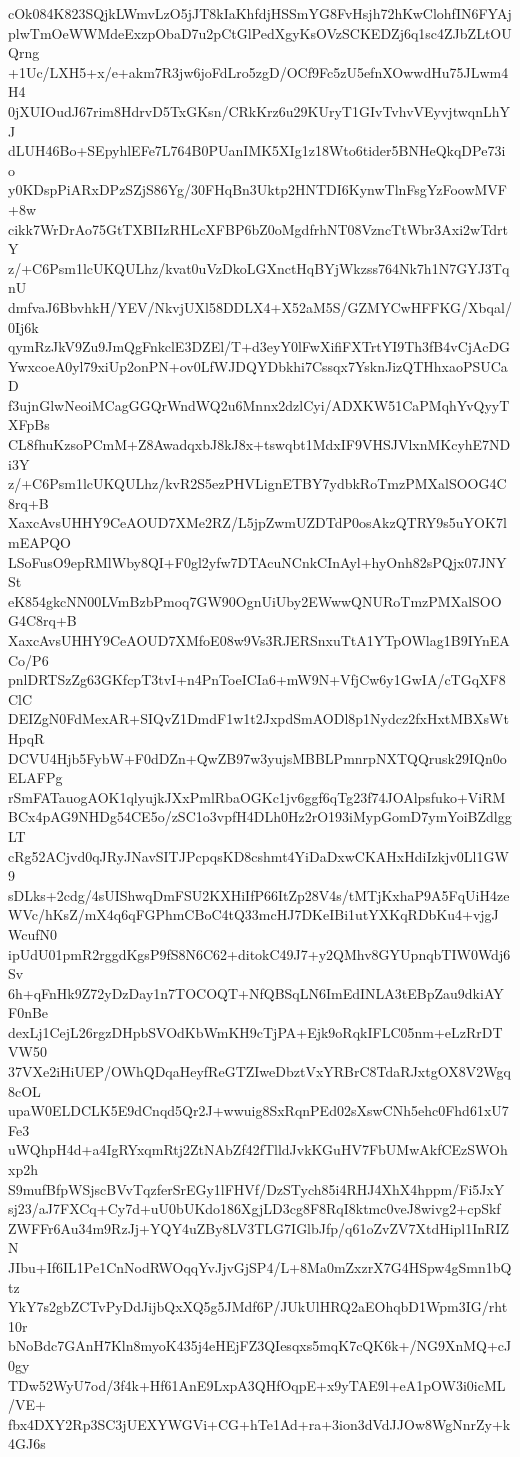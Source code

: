 cOk084K823SQjkLWmvLzO5jJT8kIaKhfdjHSSmYG8FvHsjh72hKwClohfIN6FYAj
plwTmOeWWMdeExzpObaD7u2pCtGlPedXgyKsOVzSCKEDZj6q1sc4ZJbZLtOUQrng
+1Uc/LXH5+x/e+akm7R3jw6joFdLro5zgD/OCf9Fc5zU5efnXOwwdHu75JLwm4H4
0jXUIOudJ67rim8HdrvD5TxGKsn/CRkKrz6u29KUryT1GIvTvhvVEyvjtwqnLhYJ
dLUH46Bo+SEpyhlEFe7L764B0PUanIMK5XIg1z18Wto6tider5BNHeQkqDPe73io
y0KDspPiARxDPzSZjS86Yg/30FHqBn3Uktp2HNTDI6KynwTlnFsgYzFoowMVF+8w
cikk7WrDrAo75GtTXBIIzRHLcXFBP6bZ0oMgdfrhNT08VzncTtWbr3Axi2wTdrtY
z/+C6Psm1lcUKQULhz/kvat0uVzDkoLGXnctHqBYjWkzss764Nk7h1N7GYJ3TqnU
dmfvaJ6BbvhkH/YEV/NkvjUXl58DDLX4+X52aM5S/GZMYCwHFFKG/Xbqal/0Ij6k
qymRzJkV9Zu9JmQgFnkclE3DZEl/T+d3eyY0lFwXifiFXTrtYI9Th3fB4vCjAcDG
YwxcoeA0yl79xiUp2onPN+ov0LfWJDQYDbkhi7Cssqx7YsknJizQTHhxaoPSUCaD
f3ujnGlwNeoiMCagGGQrWndWQ2u6Mnnx2dzlCyi/ADXKW51CaPMqhYvQyyTXFpBs
CL8fhuKzsoPCmM+Z8AwadqxbJ8kJ8x+tswqbt1MdxIF9VHSJVlxnMKcyhE7NDi3Y
z/+C6Psm1lcUKQULhz/kvR2S5ezPHVLignETBY7ydbkRoTmzPMXalSOOG4C8rq+B
XaxcAvsUHHY9CeAOUD7XMe2RZ/L5jpZwmUZDTdP0osAkzQTRY9s5uYOK7lmEAPQO
LSoFusO9epRMlWby8QI+F0gl2yfw7DTAcuNCnkCInAyl+hyOnh82sPQjx07JNYSt
eK854gkcNN00LVmBzbPmoq7GW90OgnUiUby2EWwwQNURoTmzPMXalSOOG4C8rq+B
XaxcAvsUHHY9CeAOUD7XMfoE08w9Vs3RJERSnxuTtA1YTpOWlag1B9IYnEACo/P6
pnlDRTSzZg63GKfcpT3tvI+n4PnToeICIa6+mW9N+VfjCw6y1GwIA/cTGqXF8ClC
DEIZgN0FdMexAR+SIQvZ1DmdF1w1t2JxpdSmAODl8p1Nydcz2fxHxtMBXsWtHpqR
DCVU4Hjb5FybW+F0dDZn+QwZB97w3yujsMBBLPmnrpNXTQQrusk29IQn0oELAFPg
rSmFATauogAOK1qlyujkJXxPmlRbaOGKc1jv6ggf6qTg23f74JOAlpsfuko+ViRM
BCx4pAG9NHDg54CE5o/zSC1o3vpfH4DLh0Hz2rO193iMypGomD7ymYoiBZdlggLT
cRg52ACjvd0qJRyJNavSITJPcpqsKD8cshmt4YiDaDxwCKAHxHdiIzkjv0Ll1GW9
sDLks+2cdg/4sUIShwqDmFSU2KXHiIfP66ItZp28V4s/tMTjKxhaP9A5FqUiH4ze
WVc/hKsZ/mX4q6qFGPhmCBoC4tQ33mcHJ7DKeIBi1utYXKqRDbKu4+vjgJWcufN0
ipUdU01pmR2rggdKgsP9fS8N6C62+ditokC49J7+y2QMhv8GYUpnqbTIW0Wdj6Sv
6h+qFnHk9Z72yDzDay1n7TOCOQT+NfQBSqLN6ImEdINLA3tEBpZau9dkiAYF0nBe
dexLj1CejL26rgzDHpbSVOdKbWmKH9cTjPA+Ejk9oRqkIFLC05nm+eLzRrDTVW50
37VXe2iHiUEP/OWhQDqaHeyfReGTZIweDbztVxYRBrC8TdaRJxtgOX8V2Wgq8cOL
upaW0ELDCLK5E9dCnqd5Qr2J+wwuig8SxRqnPEd02sXswCNh5ehc0Fhd61xU7Fe3
uWQhpH4d+a4IgRYxqmRtj2ZtNAbZf42fTlldJvkKGuHV7FbUMwAkfCEzSWOhxp2h
S9mufBfpWSjscBVvTqzferSrEGy1lFHVf/DzSTych85i4RHJ4XhX4hppm/Fi5JxY
sj23/aJ7FXCq+Cy7d+uU0bUKdo186XgjLD3cg8F8RqI8ktmc0veJ8wivg2+cpSkf
ZWFFr6Au34m9RzJj+YQY4uZBy8LV3TLG7IGlbJfp/q61oZvZV7XtdHipl1InRIZN
JIbu+If6IL1Pe1CnNodRWOqqYvJjvGjSP4/L+8Ma0mZxzrX7G4HSpw4gSmn1bQtz
YkY7s2gbZCTvPyDdJijbQxXQ5g5JMdf6P/JUkUlHRQ2aEOhqbD1Wpm3IG/rht10r
bNoBdc7GAnH7Kln8myoK435j4eHEjFZ3QIesqxs5mqK7cQK6k+/NG9XnMQ+cJ0gy
TDw52WyU7od/3f4k+Hf61AnE9LxpA3QHfOqpE+x9yTAE9l+eA1pOW3i0icML/VE+
fbx4DXY2Rp3SC3jUEXYWGVi+CG+hTe1Ad+ra+3ion3dVdJJOw8WgNnrZy+k4GJ6s
